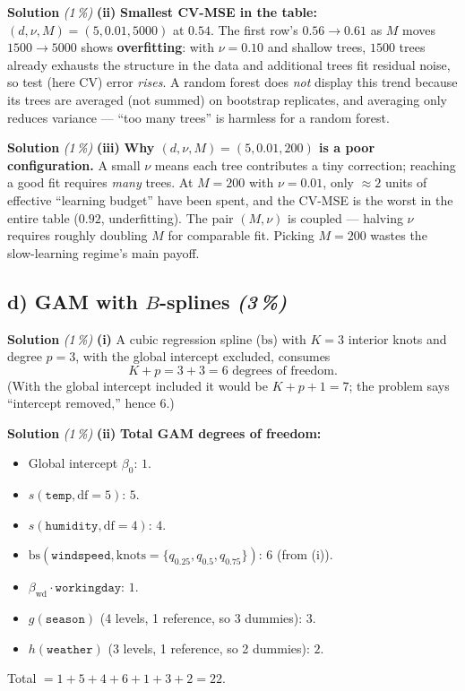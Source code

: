 \documentclass[11pt,a4paper]{article}
\newcommand{\subpoints}[1]{\textit{(#1\,\%)}}
\newcommand{\sol}{\noindent\textbf{Solution}}
\begin{document}
\medskip
\sol{} \subpoints{1} \textbf{(ii)} \textbf{Smallest CV-MSE in the table:}
$(d, \nu, M) = (5, 0.01, 5000)$ at $\boxed{0.54}$. The first row's $0.56 \to 0.61$ as $M$ moves
$1500 \to 5000$ shows \textbf{overfitting}: with $\nu = 0.10$ and shallow trees, $1500$ trees
already exhausts the structure in the data and additional trees fit residual noise, so test
(here CV) error \emph{rises}. A random forest does \emph{not} display this trend because its trees
are averaged (not summed) on bootstrap replicates, and averaging only reduces variance --- ``too
many trees'' is harmless for a random forest.

\medskip
\sol{} \subpoints{1} \textbf{(iii)} \textbf{Why $(d, \nu, M) = (5, 0.01, 200)$ is a poor
configuration.} A small $\nu$ means each tree contributes a tiny correction; reaching a good fit
requires \emph{many} trees. At $M = 200$ with $\nu = 0.01$, only $\approx 2$ units of effective
``learning budget'' have been spent, and the CV-MSE is the worst in the entire table ($0.92$,
underfitting). The pair $(M, \nu)$ is coupled --- halving $\nu$ requires roughly doubling $M$ for
comparable fit. Picking $M = 200$ wastes the slow-learning regime's main payoff.

\subsection*{d) GAM with $B$-splines \subpoints{3}}

\sol{} \subpoints{1} \textbf{(i)} A cubic regression spline ($\mathrm{bs}$) with $K = 3$ interior
knots and degree $p = 3$, with the global intercept excluded, consumes
$$K + p = 3 + 3 = \boxed{6}\text{ degrees of freedom.}$$
(With the global intercept included it would be $K + p + 1 = 7$; the problem says ``intercept
removed,'' hence $6$.)

\medskip
\sol{} \subpoints{1} \textbf{(ii)} \textbf{Total GAM degrees of freedom:}
\begin{itemize}
  \item Global intercept $\beta_0$: $1$.
  \item $s(\texttt{temp}, \mathrm{df}=5)$: $5$.
  \item $s(\texttt{humidity}, \mathrm{df}=4)$: $4$.
  \item $\mathrm{bs}(\texttt{windspeed}, \mathrm{knots} = \{q_{0.25}, q_{0.5}, q_{0.75}\})$: $6$
        (from (i)).
  \item $\beta_{\text{wd}}\cdot\texttt{workingday}$: $1$.
  \item $g(\texttt{season})$ (4 levels, 1 reference, so 3 dummies): $3$.
  \item $h(\texttt{weather})$ (3 levels, 1 reference, so 2 dummies): $2$.
\end{itemize}
Total $= 1 + 5 + 4 + 6 + 1 + 3 + 2 = \boxed{22}$.
\end{document}
